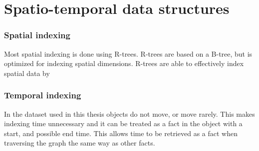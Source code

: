 
\chapter{Spatio-temporal data structures}

\subsection{Spatial indexing}
Most spatial indexing is done using R-trees. R-trees are based on a B-tree, but is optimized for indexing spatial dimensions. R-trees are able to effectively index spatial data by 

\subsection{Temporal indexing}
In the dataset used in this thesis objects do not move, or move rarely. This makes indexing time unnecessary and it can be treated as a fact in the object with a start, and possible end time. This allows time to be retrieved as a fact when traversing the graph the same way as other facts.

\cleardoublepage